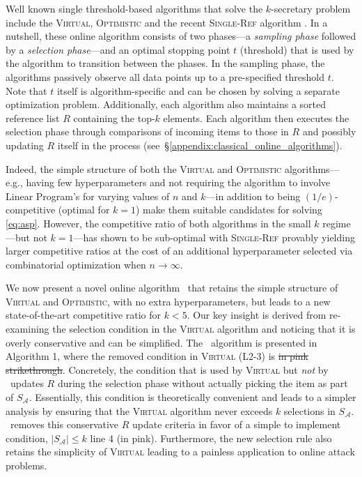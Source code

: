 Well known single threshold-based algorithms that solve the $k$-secretary problem include the \textsc{Virtual}, \textsc{Optimistic} \cite{babaioff2007knapsack} and the recent \textsc{Single-Ref} algorithm \cite{albers2020new}. In a nutshell, these online algorithm consists of two phases---a \textit{sampling phase} followed by a \textit{selection phase}---and an optimal stopping point $t$ (threshold) that is used by the algorithm to transition between the phases. In the sampling phase, the algorithms passively observe all data points up to a pre-specified threshold $t$. Note that $t$ itself is algorithm-specific and can be chosen by solving a separate optimization problem. Additionally, each algorithm also maintains a sorted reference list $R$ containing the top-$k$ elements. Each algorithm then executes the selection phase through comparisons of incoming items to those in $R$ and possibly updating $R$ itself in the process (see~\S\ref{appendix:classical_online_algorithms}).

Indeed, the simple structure of both the \textsc{Virtual} and \textsc{Optimistic} algorithms---e.g., having few hyperparameters and not requiring the algorithm to involve Linear Program's for varying values of $n$ and $k$---in addition to being $(1/e)$-competitive (optimal for $k=1$) make them suitable candidates for solving \eqref{eq:asp}. However, 
the competitive ratio of both algorithms in the small $k$ regime---but not $k=1$---has shown to be sub-optimal with \textsc{Single-Ref} provably yielding larger competitive ratios at the cost of an additional hyperparameter selected via combinatorial optimization when $n \to \infty$. 

We now present a novel online algorithm \algoname\ that retains the simple structure of \textsc{Virtual} and \textsc{Optimistic}, with no extra hyperparameters, but leads to a new state-of-the-art competitive ratio for $k<5$. Our key insight is derived from re-examining the selection condition in the \textsc{Virtual} algorithm and noticing that it is overly conservative and can be simplified. The \algoname\ algorithm is presented in Algorithm 1, where the removed condition in \textsc{Virtual} (L2-3) is \st{in pink strikethrough}. Concretely, the condition that is used by \textsc{Virtual} but \emph{not} by \algoname\ updates $R$ during the selection phase without actually picking the item as part of $S_{\mathcal{A}}$. Essentially, this condition is theoretically convenient and leads to a simpler analysis by ensuring that the \textsc{Virtual} algorithm never exceeds $k$ selections in $S_{\mathcal{A}}$. \algoname\ removes this conservative $R$ update criteria in favor of a simple to implement condition, $|S_{\mathcal{A}}| \leq k$ line 4 {\color{salmon}(in pink)}. Furthermore, the new selection rule also retains the simplicity of \textsc{Virtual} leading to a painless application to online attack problems.

